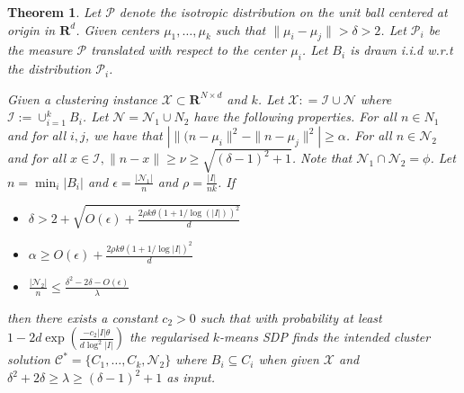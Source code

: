 \documentclass[12pt]{article}
\newcommand{\mc}{\mathcal}
\newcommand{\mb}{\mathbf}
\newtheorem{theorem}{Theorem}
\begin{document}
\begin{theorem}
\label{a-thm:regSDPIsometric}
Let $\mc P$ denote the isotropic distribution on the unit ball centered at origin in $\mb R^d$. Given centers $\mu_1, \ldots, \mu_k$ such that $\|\mu_i - \mu_j\| > \delta > 2$. Let $\mc P_i$ be the measure $\mc P$ translated with respect to the center $\mu_i$. Let $B_i$ is drawn i.i.d w.r.t the distribution $\mc P_i$. 

Given a clustering instance $\mc X \subset \mb R^{N \times d}$ and $k$. Let $\mc X : = \mc I \cup \mc N$ where $\mc I := \cup_{i=1}^k B_i$. Let $\mc N = \mc N_1 \cup N_2$ have the following properties. For all $n \in N_1$ and for all $i, j$, we have that $| \|(n-\mu_i\|^2 - \|n-\mu_j\|^2| \ge \alpha$. For all $n \in \mc N_2$ and for all $x \in \mc I, \|n- x\| \ge \nu \ge \sqrt{(\delta-1)^2+1}$. Note that $\mc N_1 \cap \mc N_2 = \phi$. Let $n = \min_i |B_i|$ and $\epsilon = \frac{|\mc N_1|}{n}$ and $\rho = \frac{|I|}{nk}$. If  

\begin{itemize}
  \item $\delta > 2 + \sqrt{ O(\epsilon) + \frac{2\rho k\theta(1+1/\log(|I|))^2}{d}}$ 
  \item $\alpha \ge O(\epsilon)+ \frac{2\rho k\theta(1+1/\log|I|)^2}{d}$ 
  \item $\frac{|\mc N_2|}{n} \le \frac{\delta^2-2\delta-O(\epsilon)}{\lambda}$
\end{itemize}
then there exists a constant $c_2 > 0$ such that with probability at least $1 - 2d\exp(\frac{-c_2|I|\theta}{d\log^2|I|})$ the regularised $k$-means SDP finds the intended cluster solution  $\mc C^* = \{C_1, \ldots, C_k, \mc N_2\}$ where $B_i \subseteq C_i$ when given $\mc X$ and $\delta^2+2\delta \ge \lambda \ge (\delta-1)^2 + 1$ as input.
\end{theorem}
\end{document}
